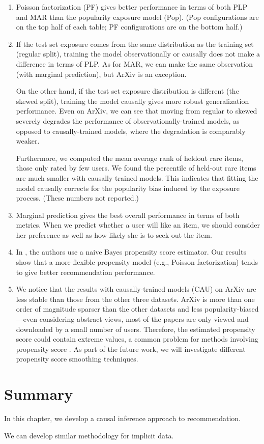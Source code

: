 \begin{enumerate}[leftmargin=*]
\item Poisson factorization (PF) gives better performance in terms of
  both PLP and MAR than the popularity exposure model (Pop). (Pop
  configurations are on the top half of each table; PF
  configurations are on the bottom half.)

\item If the test set exposure comes from the same distribution as the
  training set (regular split), training the model observationally or
  causally does not make a difference in terms of PLP. As for MAR,
  we can make the same observation (with marginal
  prediction), but ArXiv is an exception.

  On the other hand, if the test set exposure distribution is
  different (the skewed split), training the model causally gives more
  robust generalization performance. Even on ArXiv, we can see that
  moving from regular to skewed severely degrades the performance of
  observationally-trained models, as opposed to causally-trained
  models, where the degradation is comparably weaker.

  Furthermore, we computed the mean average rank of heldout rare
  items, those only rated by few users. We found the percentile
  of held-out rare items are much smaller with causally trained models.
  This indicates that fitting the model causally corrects for the
  popularity bias induced by the exposure process.  (These numbers not
  reported.)

\item Marginal prediction gives the best overall performance in
  terms of both metrics. When we predict whether
  a user will like an item, we should consider her preference as well
  as how likely she is to seek out the item.

\item In \citet{schnabel16treatment}, the authors use a naive Bayes
  propensity score estimator. Our results show that a more
  flexible propensity model (e.g., Poisson factorization) tends to
  give better recommendation performance.

\item We notice that the results with causally-trained models
  (CAU) on ArXiv are less stable than those from the other three
  datasets. ArXiv is more than one order of magnitude sparser than the
  other datasets and less popularity-biased---even considering
  abstract views, most of the papers are only viewed and downloaded by
  a small number of users. Therefore, the estimated propensity score
  could contain extreme values, a common problem for methods involving
  propensity score \citep{morgan2014counterfactuals}. As part of the
  future work, we will investigate different propensity score
  smoothing techniques.
\end{enumerate}

\section{Summary}

In this chapter, we develop a causal inference approach to recommendation. 

\PP We can develop similar methodology for implicit data. 






